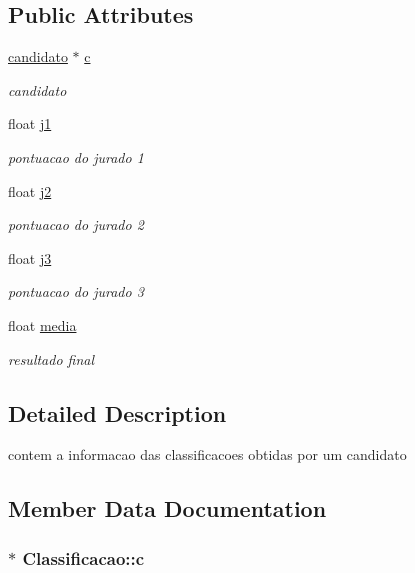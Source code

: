 \subsection*{Public Attributes}
\begin{DoxyCompactItemize}
\item 
\hyperlink{classcandidato}{candidato} $\ast$ \hyperlink{structClassificacao_a0d17a3011d8d230f262da09d271f66c5}{c}
\begin{DoxyCompactList}\small\item\em candidato \end{DoxyCompactList}\item 
float \hyperlink{structClassificacao_abe2dfdf576aadbd510980c17d337a1a9}{j1}
\begin{DoxyCompactList}\small\item\em pontuacao do jurado 1 \end{DoxyCompactList}\item 
float \hyperlink{structClassificacao_a1221d2875f866a4c9fea21f04888796a}{j2}
\begin{DoxyCompactList}\small\item\em pontuacao do jurado 2 \end{DoxyCompactList}\item 
float \hyperlink{structClassificacao_a3fd75e4d2503d5ecdb88814b808c6929}{j3}
\begin{DoxyCompactList}\small\item\em pontuacao do jurado 3 \end{DoxyCompactList}\item 
float \hyperlink{structClassificacao_a5f7d29ed16f73699cf485006bd333007}{media}
\begin{DoxyCompactList}\small\item\em resultado final \end{DoxyCompactList}\end{DoxyCompactItemize}


\subsection{Detailed Description}
contem a informacao das classificacoes obtidas por um candidato 

\subsection{Member Data Documentation}
\subsubsection[{\texorpdfstring{c}{c}}]{$\ast$ Classificacao\+::c}\hypertarget{structClassificacao_a0d17a3011d8d230f262da09d271f66c5}{}\label{structClassificacao_a0d17a3011d8d230f262da09d271f66c5}


